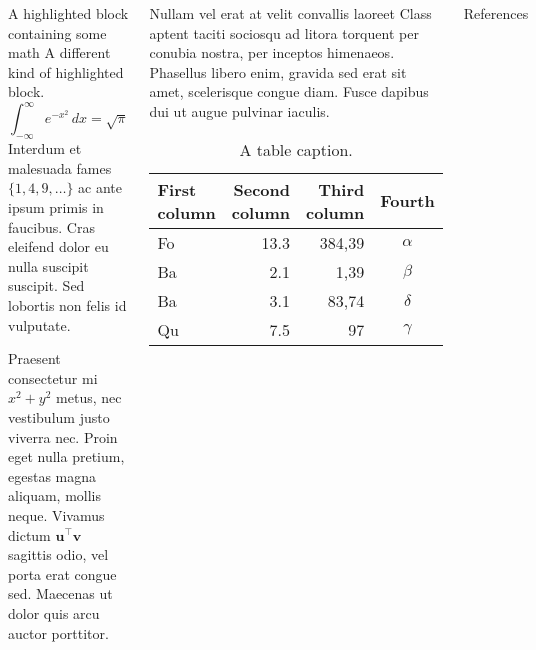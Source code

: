 \documentclass{beamer}
\begin{document}
\begin{frame}[t]
\begin{columns}[t]
    \column{0.3\paperwidth}
    \begin{exampleblock}{A highlighted block containing some math}
      A different kind of highlighted block.
      $$\int_{-\infty}^{\infty} e^{-x^2}\,dx = \sqrt{\pi}$$
      Interdum et malesuada fames $\{1, 4, 9, \ldots\}$ ac ante ipsum primis in
      faucibus. Cras eleifend dolor eu nulla suscipit suscipit. Sed lobortis non
      felis id vulputate.

      Praesent consectetur mi $x^2 + y^2$ metus, nec vestibulum justo viverra
      nec. Proin eget nulla pretium, egestas magna aliquam, mollis neque. Vivamus
      dictum $\mathbf{u}^\intercal\mathbf{v}$ sagittis odio, vel porta erat
      congue sed. Maecenas ut dolor quis arcu auctor porttitor.
    \end{exampleblock}

    \begin{block}{Nullam vel erat at velit convallis laoreet}
      Class aptent taciti sociosqu ad litora torquent per conubia nostra, per
      inceptos himenaeos. Phasellus libero enim, gravida sed erat sit amet,
      scelerisque congue diam. Fusce dapibus dui ut augue pulvinar iaculis.
      \begin{table}
        \centering
        \begin{tabular}{l r r c}
          \toprule
          \textbf{First column} & \textbf{Second column} & \textbf{Third column} & \textbf{Fourth} \\
          \midrule
          Fo                    & 13.3                   & 384,39                & $\alpha$        \\
          Ba                    & 2.1                    & 1,39                  & $\beta$         \\
          Ba                    & 3.1                    & 83,74                 & $\delta$        \\
          Qu                    & 7.5                    & 97                    & $\gamma$        \\
          \bottomrule
        \end{tabular}
        \caption{A table caption.}
      \end{table}
    \end{block}

    \begin{block}{References}
      \nocite{*}
      
    \end{block}
  \end{columns}
\end{frame}
\end{document}
